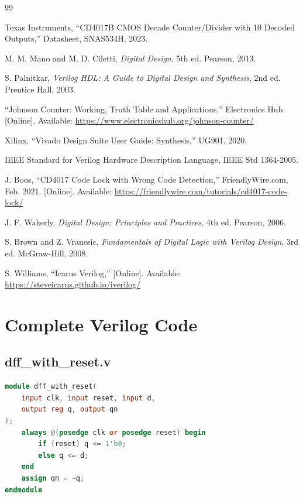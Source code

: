 \documentclass[12pt,a4paper]{report}
\begin{document}
\begin{thebibliography}{99}

Texas Instruments, ``CD4017B CMOS Decade Counter/Divider with 10 Decoded Outputs,'' Datasheet, SNAS534H, 2023.

M. M. Mano and M. D. Ciletti, \textit{Digital Design}, 5th ed. Pearson, 2013.

S. Palnitkar, \textit{Verilog HDL: A Guide to Digital Design and Synthesis}, 2nd ed. Prentice Hall, 2003.

``Johnson Counter: Working, Truth Table and Applications,'' Electronics Hub. [Online]. Available: \url{https://www.electronicshub.org/johnson-counter/}

Xilinx, ``Vivado Design Suite User Guide: Synthesis,'' UG901, 2020.

IEEE Standard for Verilog Hardware Description Language, IEEE Std 1364-2005.

J. Boos, ``CD4017 Code Lock with Wrong Code Detection,'' FriendlyWire.com, Feb. 2021. [Online]. Available: \url{https://friendlywire.com/tutorials/cd4017-code-lock/}

J. F. Wakerly, \textit{Digital Design: Principles and Practices}, 4th ed. Pearson, 2006.

S. Brown and Z. Vranesic, \textit{Fundamentals of Digital Logic with Verilog Design}, 3rd ed. McGraw-Hill, 2008.

S. Williams, ``Icarus Verilog,'' [Online]. Available: \url{https://steveicarus.github.io/iverilog/}

\end{thebibliography}

\appendix

\chapter{Complete Verilog Code}

\section{dff\_with\_reset.v}
\begin{lstlisting}[language=Verilog]
module dff_with_reset(
    input clk, input reset, input d,
    output reg q, output qn
);
    always @(posedge clk or posedge reset) begin
        if (reset) q <= 1'b0;
        else q <= d;
    end
    assign qn = ~q;
endmodule
\end{lstlisting}
\end{document}
